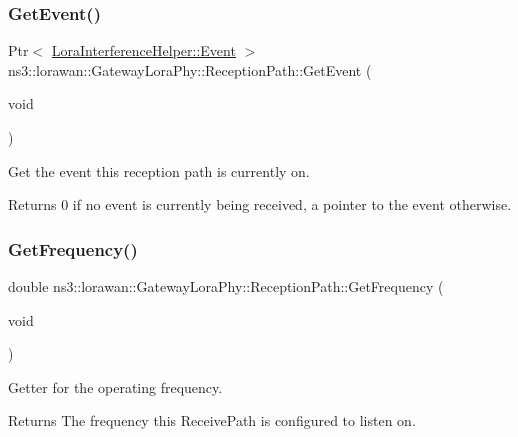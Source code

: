 \subsubsection{\texorpdfstring{Get\+Event()}{GetEvent()}}
{\footnotesize\ttfamily Ptr$<$ \hyperlink{classns3_1_1lorawan_1_1LoraInterferenceHelper_1_1Event}{Lora\+Interference\+Helper\+::\+Event} $>$ ns3\+::lorawan\+::\+Gateway\+Lora\+Phy\+::\+Reception\+Path\+::\+Get\+Event (\begin{DoxyParamCaption}\item[{void}]{ }\end{DoxyParamCaption})}

Get the event this reception path is currently on.

\begin{DoxyReturn}{Returns}
0 if no event is currently being received, a pointer to the event otherwise. 
\end{DoxyReturn}
\mbox{\label{classns3_1_1lorawan_1_1GatewayLoraPhy_1_1ReceptionPath_ae069eaa0189fa51ee4cb7aa3941e426e}} 
\subsubsection{\texorpdfstring{Get\+Frequency()}{GetFrequency()}}
{\footnotesize\ttfamily double ns3\+::lorawan\+::\+Gateway\+Lora\+Phy\+::\+Reception\+Path\+::\+Get\+Frequency (\begin{DoxyParamCaption}\item[{void}]{ }\end{DoxyParamCaption})}

Getter for the operating frequency.

\begin{DoxyReturn}{Returns}
The frequency this Receive\+Path is configured to listen on. 
\end{DoxyReturn}
\mbox{\label{classns3_1_1lorawan_1_1GatewayLoraPhy_1_1ReceptionPath_ad2422662f1100b92a4267de0976f9b0b}} 
